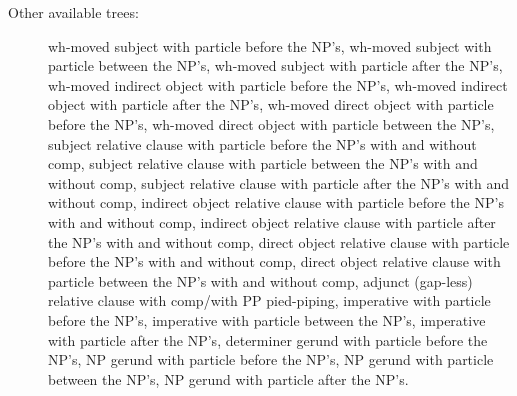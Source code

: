 \begin{description}
\item[Other available trees:] wh-moved subject with particle before the NP's, 
wh-moved subject with particle between the NP's, wh-moved subject with particle 
after the NP's, wh-moved indirect object with particle before the NP's, 
wh-moved indirect object with particle after the NP's, wh-moved direct object 
with particle before the NP's, wh-moved direct object with particle between the 
NP's, subject relative clause with particle before the NP's with and without comp, 
subject relative clause with particle between the NP's with and without comp, 
subject relative clause with particle after the NP's with and without comp, 
indirect object relative clause with particle before the NP's with and without comp, 
indirect object relative clause with particle after the NP's with and without comp, 
direct object relative clause with particle before the NP's with and without comp, 
direct object relative clause with particle between the NP's with and without comp, 
adjunct (gap-less) relative clause with comp/with PP pied-piping, 
imperative with particle before the NP's, 
imperative with particle between the NP's, imperative with particle after the 
NP's, determiner gerund with particle before the NP's, NP gerund with particle 
before the NP's, NP gerund with particle between the NP's, NP gerund with 
particle after the NP's. 
 
\end{description} 
 
 
 
 
 
